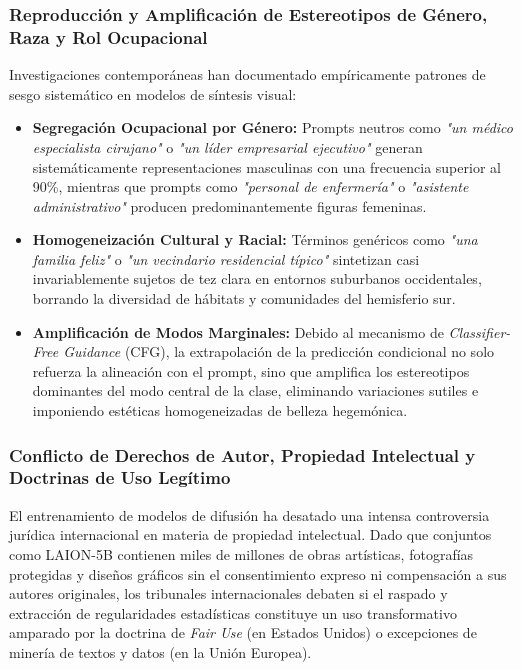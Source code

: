 \subsubsection{Reproducción y Amplificación de Estereotipos de Género, Raza y Rol Ocupacional}

Investigaciones contemporáneas han documentado empíricamente patrones de sesgo sistemático en modelos de síntesis visual:
\begin{itemize}
    \item \textbf{Segregación Ocupacional por Género:} Prompts neutros como \textit{"un médico especialista cirujano"} o \textit{"un líder empresarial ejecutivo"} generan sistemáticamente representaciones masculinas con una frecuencia superior al 90\%, mientras que prompts como \textit{"personal de enfermería"} o \textit{"asistente administrativo"} producen predominantemente figuras femeninas.
    \item \textbf{Homogeneización Cultural y Racial:} Términos genéricos como \textit{"una familia feliz"} o \textit{"un vecindario residencial típico"} sintetizan casi invariablemente sujetos de tez clara en entornos suburbanos occidentales, borrando la diversidad de hábitats y comunidades del hemisferio sur.
    \item \textbf{Amplificación de Modos Marginales:} Debido al mecanismo de \textit{Classifier-Free Guidance} (CFG), la extrapolación de la predicción condicional no solo refuerza la alineación con el prompt, sino que amplifica los estereotipos dominantes del modo central de la clase, eliminando variaciones sutiles e imponiendo estéticas homogeneizadas de belleza hegemónica.
\end{itemize}

\subsubsection{Conflicto de Derechos de Autor, Propiedad Intelectual y Doctrinas de Uso Legítimo}

El entrenamiento de modelos de difusión ha desatado una intensa controversia jurídica internacional en materia de propiedad intelectual. Dado que conjuntos como LAION-5B contienen miles de millones de obras artísticas, fotografías protegidas y diseños gráficos sin el consentimiento expreso ni compensación a sus autores originales, los tribunales internacionales debaten si el raspado y extracción de regularidades estadísticas constituye un uso transformativo amparado por la doctrina de \textit{Fair Use} (en Estados Unidos) o excepciones de minería de textos y datos (en la Unión Europea).

